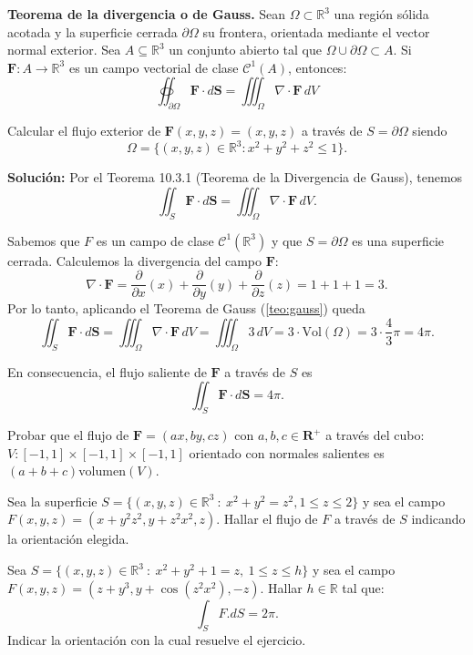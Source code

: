 

\begin{theorem}\label{teo:gauss}
\textbf{Teorema de la divergencia o de Gauss.} Sean $\Omega \subset \mathbb{R}^3$ una región sólida acotada y la superficie cerrada $\partial \Omega$ su frontera,  orientada mediante el vector normal exterior. Sea $A \subseteq \mathbb{R}^3$ un conjunto abierto tal que $\Omega \cup \partial \Omega  \subset A$. Si $\mathbf{F}: A \to \mathbb{R}^3$ es un campo vectorial de clase $\mathcal{C}^1(A)$, entonces:
\[
    \oiint_{\partial \Omega} \mathbf{F} \cdot d\mathbf{S} = \iiint_{\Omega} \nabla \cdot \mathbf{F} \, dV
\]
\end{theorem}



\begin{example}
Calcular el flujo exterior de $\mathbf{F}(x, y, z) = (x, y, z)$ a  trav\'es de $S = \partial \Omega$ siendo   
\[
\Omega = \{(x, y, z) \in \mathbb{R}^3 : x^2 + y^2 + z^2 \leq 1\}.
\]
\end{example}

\noindent\textbf{Solución: } Por el Teorema 10.3.1 (Teorema de la Divergencia de Gauss), tenemos
\[
\iint_S \mathbf{F} \cdot d\mathbf{S} = \iiint_{\Omega} \nabla \cdot \mathbf{F} \, dV.
\]

Sabemos que $F$ es un campo de clase  $\mathcal{C}^1(\mathbb{R}^{3})$  y que $S= \partial \Omega$ es una superficie cerrada. Calculemos la divergencia del campo $\mathbf{F}$:
\[
\nabla \cdot \mathbf{F} = \frac{\partial}{\partial x}(x) + \frac{\partial}{\partial y}(y) + \frac{\partial}{\partial z}(z) = 1 + 1 + 1 = 3.
\] Por lo tanto, aplicando el Teorema de Gauss (\ref{teo:gauss}) queda
\[
\iint_S \mathbf{F} \cdot d\mathbf{S} = \iiint_{\Omega} \nabla \cdot \mathbf{F} \, dV = \iiint_{\Omega} 3 \, dV = 3 \cdot \text{Vol}(\Omega) = 3 \cdot \frac{4}{3}\pi = 4\pi.
\]

En consecuencia, el flujo saliente de $\mathbf{F}$ a trav\'es de $S$ es
\[
\boxed{\iint_S \mathbf{F} \cdot d\mathbf{S} = 4\pi}.
\]



\begin{tarea}
 Probar que el flujo de $\mathbf{F} = (ax, by, cz)$ con $a,b,c \in \mathbf{R}^+$ a través del cubo: $V : [-1,1] \times [-1,1] \times [-1,1]$ orientado con normales salientes es $(a+b+c) \mathrm{volumen}(V)$.
\end{tarea} 


\begin{tarea}
 Sea la superficie   $S=\{  (x,y,z) \in \mathbb{R}^{3} \: : \: x ^{2}+ y^{2} = z^{2}, 1 \leq z \leq 2 \}$   y   sea el campo $F(x,y,z)=(x+y^{2}z^{2}, y+z^{2}x^{2}, z).$  Hallar el flujo  de $F$ a trav\'es de $S$ indicando la orientaci\'on elegida.
\end{tarea}  



\begin{tarea}
Sea  $S=\{  (x,y,z) \in \mathbb{R}^{3} \: : \: x ^{2}+ y^{2} +1= z,  \:  1\leq z \leq h\}$  y sea  el campo $F(x,y,z)=(z+y^{3},  y+ \cos (z^{2}x^{2}),  -z).$    Hallar $h \in \mathbb{R}$ tal que: $$\int_{S} F . dS = 2\pi. $$  Indicar la orientaci\'on con la cual resuelve el ejercicio.
\end{tarea}